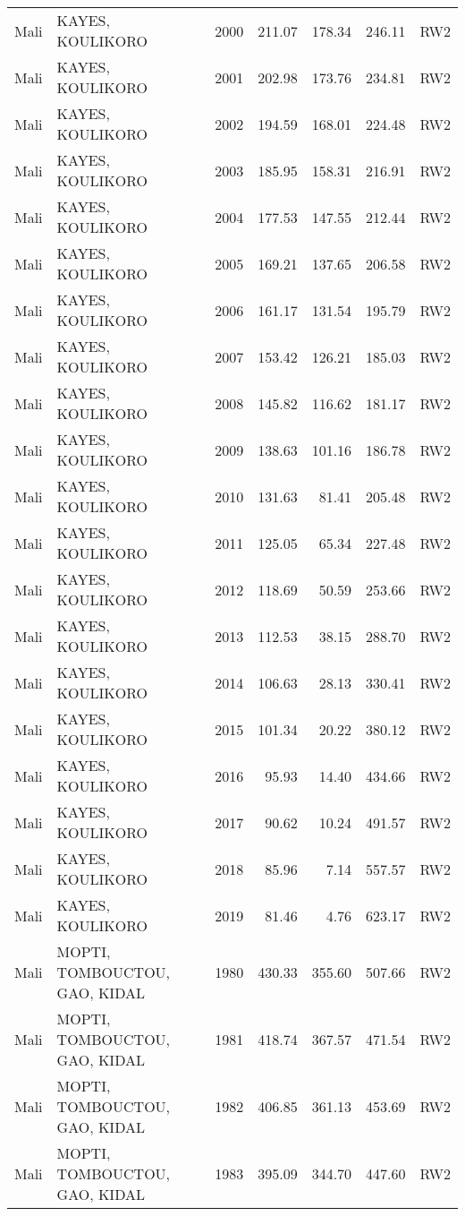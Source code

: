 \begin{longtable}{lllrrrl}
  Mali & KAYES, KOULIKORO & 2000 & 211.07 & 178.34 & 246.11 & RW2 \\ 
  Mali & KAYES, KOULIKORO & 2001 & 202.98 & 173.76 & 234.81 & RW2 \\ 
  Mali & KAYES, KOULIKORO & 2002 & 194.59 & 168.01 & 224.48 & RW2 \\ 
  Mali & KAYES, KOULIKORO & 2003 & 185.95 & 158.31 & 216.91 & RW2 \\ 
  Mali & KAYES, KOULIKORO & 2004 & 177.53 & 147.55 & 212.44 & RW2 \\ 
  Mali & KAYES, KOULIKORO & 2005 & 169.21 & 137.65 & 206.58 & RW2 \\ 
  Mali & KAYES, KOULIKORO & 2006 & 161.17 & 131.54 & 195.79 & RW2 \\ 
  Mali & KAYES, KOULIKORO & 2007 & 153.42 & 126.21 & 185.03 & RW2 \\ 
  Mali & KAYES, KOULIKORO & 2008 & 145.82 & 116.62 & 181.17 & RW2 \\ 
  Mali & KAYES, KOULIKORO & 2009 & 138.63 & 101.16 & 186.78 & RW2 \\ 
  Mali & KAYES, KOULIKORO & 2010 & 131.63 & 81.41 & 205.48 & RW2 \\ 
  Mali & KAYES, KOULIKORO & 2011 & 125.05 & 65.34 & 227.48 & RW2 \\ 
  Mali & KAYES, KOULIKORO & 2012 & 118.69 & 50.59 & 253.66 & RW2 \\ 
  Mali & KAYES, KOULIKORO & 2013 & 112.53 & 38.15 & 288.70 & RW2 \\ 
  Mali & KAYES, KOULIKORO & 2014 & 106.63 & 28.13 & 330.41 & RW2 \\ 
  Mali & KAYES, KOULIKORO & 2015 & 101.34 & 20.22 & 380.12 & RW2 \\ 
  Mali & KAYES, KOULIKORO & 2016 & 95.93 & 14.40 & 434.66 & RW2 \\ 
  Mali & KAYES, KOULIKORO & 2017 & 90.62 & 10.24 & 491.57 & RW2 \\ 
  Mali & KAYES, KOULIKORO & 2018 & 85.96 & 7.14 & 557.57 & RW2 \\ 
  Mali & KAYES, KOULIKORO & 2019 & 81.46 & 4.76 & 623.17 & RW2 \\ 
  Mali & MOPTI, TOMBOUCTOU, GAO, KIDAL & 1980 & 430.33 & 355.60 & 507.66 & RW2 \\ 
  Mali & MOPTI, TOMBOUCTOU, GAO, KIDAL & 1981 & 418.74 & 367.57 & 471.54 & RW2 \\ 
  Mali & MOPTI, TOMBOUCTOU, GAO, KIDAL & 1982 & 406.85 & 361.13 & 453.69 & RW2 \\ 
  Mali & MOPTI, TOMBOUCTOU, GAO, KIDAL & 1983 & 395.09 & 344.70 & 447.60 & RW2 \\ 

\end{longtable}

